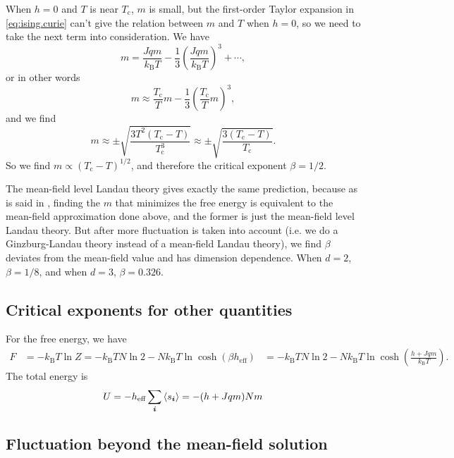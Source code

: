 \documentclass[hyperref, a4paper]{article}
\def\\{}%
\newcommand*{\Tc}{T_{\text{c}}}
\newcommand*{\kB}{k_{\text{B}}}
\begin{document}
When $h = 0$ and $T$ is near $\Tc$, 
$m$ is small,
but the first-order Taylor expansion in \eqref{eq:ising.curie} 
can't give the relation between $m$ and $T$ when $h = 0$, 
so we need to take the next term into consideration. 
We have 
\[
    m = \frac{J q m}{\kB T} - \frac{1}{3} \left(
        \frac{J q m}{\kB T}
    \right)^3 + \cdots, 
\]
or in other words 
\[
    m \approx \frac{\Tc}{T} m - \frac{1}{3} \left(
        \frac{\Tc}{T} m
    \right)^3,
\]
and we find 
\begin{equation}
    m \approx \pm \sqrt{
        \frac{3 T^2 (\Tc - T)}{\Tc^3} 
    } \approx \pm \sqrt{
        \frac{3 (\Tc - T)}{\Tc} 
    }.
\end{equation}
So we find $m \propto (\Tc - T)^{1/2}$, 
and therefore the critical exponent $\beta = 1/2$.

The mean-field level Landau theory gives exactly the same prediction, 
because as is said in , 
finding the $m$ that minimizes the free energy 
is equivalent to the mean-field approximation done above, 
and the former is just the mean-field level Landau theory. 
But after more fluctuation is taken into account 
(i.e. we do a Ginzburg-Landau theory instead of a mean-field Landau theory), 
we find $\beta$ deviates from the mean-field value and 
has dimension dependence.
When $d = 2$, $\beta = 1/8$, 
and when $d = 3$, $\beta = 0.326$.

\subsection{Critical exponents for other quantities}

For the free energy, we have 
\begin{equation}
    \begin{aligned}
        F &= - \kB T \ln Z = - \kB T N \ln 2 - N \kB T \ln \cosh (\beta h_{\text{eff}}) \\
        &= - \kB T N \ln 2 - N \kB T \ln \cosh (
            \frac{h + Jq m}{\kB T}
        ).
    \end{aligned}
\end{equation}
The total energy is 
\begin{equation}
    U = - h_{\text{eff}} \sum_{\vb*{i}} \expval{s_{\vb*{i}}}
     = - (h + Jqm) N m
\end{equation}

\subsection{Fluctuation beyond the mean-field solution}
\end{document}
